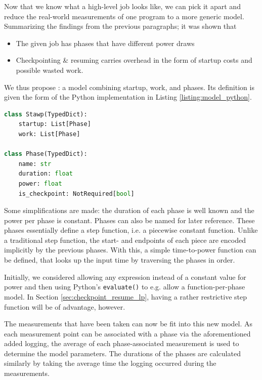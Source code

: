 Now that we know what a high-level job looks like, we can pick it apart and reduce the real-world measurements of one program to a more generic model. 
Summarizing the findings from the previous paragraphs; it was shown that 

\begin{itemize}
    \item The given job has phases that have different power draws
    \item Checkpointing \& resuming carries overhead in the form of startup costs and possible wasted work.
\end{itemize}

We thus propose \modelname{}: a model combining startup, work, and phases.
Its definition is given the form of the Python implementation in Listing \ref{listing:model_python}.

\begin{minipage}{\linewidth}
\begin{lstlisting}[language=python, frame=single, numbers=none, caption={Definition of \modelname{} as a Python class}, basicstyle=\ttfamily, label={listing:model_python}]
class Stawp(TypedDict):
    startup: List[Phase]
    work: List[Phase]
    
class Phase(TypedDict):
    name: str
    duration: float
    power: float
    is_checkpoint: NotRequired[bool]   
\end{lstlisting}
\end{minipage}

Some simplifications are made: the duration of each phase is well known and the power per phase is constant. 
Phases can also be named for later reference.
These phases essentially define a step function, i.e. a piecewise constant function.
Unlike a traditional step function, the start- and endpoints of each piece are encoded implicitly by the previous phases.
With this, a simple time-to-power function can be defined, that looks up the input time by traversing the phases in order.

Initially, we considered allowing any expression instead of a constant value for power and then using Python's \verb|evaluate()| to e.g. allow a function-per-phase model.
In Section \ref{sec:checkpoint_resume_lp}, having a rather restrictive step function will be of advantage, however.

\newpage
The measurements that have been taken can now be fit into this new model. 
As each measurement point can be associated with a phase via the aforementioned added logging, the average of each phase-associated measurement is used to determine the model parameters. 
The durations of the phases are calculated similarly by taking the average time the logging occurred during the measurements.

